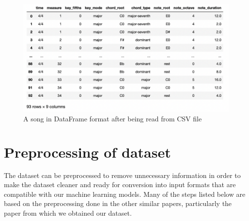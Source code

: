 \begin{figure}
\centering
\includegraphics{Figures/CSV dataframe}
\decoRule
\caption{A song in DataFrame format after being read from CSV file}
\label{fig:CSV_DF}
\end{figure}

\section{Preprocessing of dataset}
\label{preprocessing}

The dataset can be preprocessed to remove unnecessary information in order to make the dataset cleaner and ready for conversion into input formats that are compatible with our machine learning models. Many of the steps listed below are based on the preprocessing done in the other similar papers, particularly the paper \cite{BLSTM} from which we obtained our dataset.

